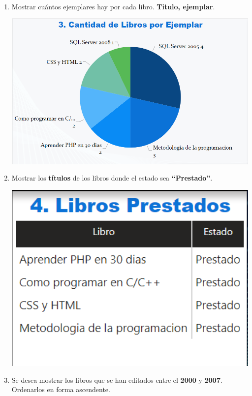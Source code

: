 \documentclass[12pt,letterpaper]{article}
\newcommand\tab[1][1cm]{\hspace*{#1}}
\begin{document}
\begin{enumerate}[\tab 1.]
\begin{center}
        \end{center}
        \item Mostrar cuántos ejemplares hay por cada libro. \textbf{Titulo, ejemplar}.
        \begin{center}
            \includegraphics[width=13cm]{./img/img15.png}
        \end{center}
        \item Mostrar los \textbf{títulos} de los libros donde el estado sea \textbf{“Prestado”}.
        \begin{center}
            \includegraphics[width=13cm]{./img/img16.png}
        \end{center}
        \item Se desea mostrar los libros que se han editados entre el \textbf{2000} y \textbf{2007}. Ordenarlos en forma ascendente.
        \begin{center}

\end{center}
\end{enumerate}
\end{document}
